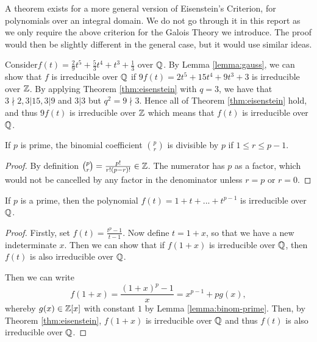 A theorem exists for a more general version of Eisenstein's Criterion, for polynomials over an integral domain. We do not go through it in this report as we only require the above criterion for the Galois Theory we introduce. The proof would then be slightly different in the general case, but it would use similar ideas.

\begin{example}
Consider$
f(t) = \frac{2}{9} t^5 + \frac{5}{3} t^4 + t^3 + \frac{1}{3}$ over $\mathbb Q$. By Lemma \ref{lemma:gauss}, we can show that $f$ is irreducible over $\mathbb Q$ if $
9f(t) = 2t^5 + 15t^4 + 9t^3 + 3
$ is irreducible over $\mathbb Z$. By applying Theorem \ref{thm:eisenstein} with $q = 3$, we have that $3 \nmid 2, 3|15, 3|9 $ and $3|3$ but $q^2 = 9 \nmid 3$. Hence all of Theorem \ref{thm:eisenstein} hold, and thus $9f(t)$ is irreducible over $\mathbb Z$ which means that $f(t)$ is irreducible over $\mathbb Q$.

\end{example}

\begin{lemma} \label{lemma:binom-prime}
If $p$ is prime, the binomial coefficient $\binom{p}{r}$ is divisible by $p$ if $1 \le r \le p-1$.
\end{lemma}

\begin{proof}
By definition $\binom{p}{r} = \frac{p!}{r!(p-r)!} \in \mathbb Z$. The numerator has $p$ as a factor, which would not be cancelled by any factor in the denominator unless $r=p$ or $r=0$.
\end{proof}

\begin{theorem}\label{thm:irreducible-prime-polynomial}
    If $p$ is a prime, then the polynomial
    $
    f(t) = 1 + t + ... + t^{p-1}
    $
    is irreducible over $\mathbb Q$.
\end{theorem}

\begin{proof}
Firstly, set $f(t) = \frac{t^p - 1}{t - 1}$. 
Now define $t =1+x$, so that we have a new indeterminate $x$. Then we can show that if $f(1+x)$ is irreducible over $\mathbb Q$, then $f(t)$ is also irreducible over $\mathbb Q$.

Then we can write $$f(1+x)=\frac{(1+x)^p - 1}{x}  = x^{p-1} + pg(x),$$ whereby $g(x)\in \mathbb Z[x]$ with constant $1$ by Lemma \ref{lemma:binom-prime}. Then, by Theorem \ref{thm:eisenstein}, $f(1+x)$ is irreducible over $\mathbb Q$ and thus $f(t)$ is also irreducible over $\mathbb Q$.
\end{proof}



